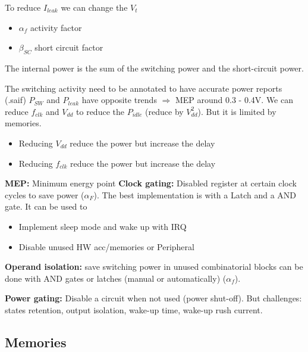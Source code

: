 To reduce \(I_{leak}\) we can change the \(V_t\) %
\bigbreak

\begin{itemize}
  \item \(\alpha_f\) activity factor
  \item \(\beta_{SC}\) short circuit factor
\end{itemize}

\bigbreak

The internal power is the sum of the switching power and the short-circuit power.

The switching activity need to be annotated to have accurate power reports (.saif)
\bigbreak
\(P_{SW}\) and \(P_{leak}\) have opposite trends \(\Rightarrow\) MEP around 0.3 - 0.4V. We can reduce \(f_{clk}\) and \(V_{dd}\)  to reduce the \(P_{idle}\) (reduce by \(V_{dd}^2\)). But it is limited by memories.
\begin{itemize}
  \item Reducing \(V_{dd}\) reduce the power but increase the delay
  \item Reducing \(f_{clk}\) reduce the power but increase the delay
\end{itemize}

\textbf{MEP:} Minimum energy point
\bigbreak
\textbf{Clock gating:} Disabled register at certain clock cycles to save power (\(\alpha_F\)). The best implementation is with a Latch and a AND gate. It can be used to
\begin{itemize}
  \item Implement sleep mode and wake up with IRQ
  \item Disable unused HW acc/memories or Peripheral
\end{itemize}

\textbf{Operand isolation:} save switching power in unused combinatorial blocks can be done with AND gates or latches (manual or automatically) (\(\alpha_f\)).

\textbf{Power gating:} Disable a circuit when not used (power shut-off). But challenges: states retention, output isolation, wake-up time, wake-up rush current.


\subsection{Memories}

